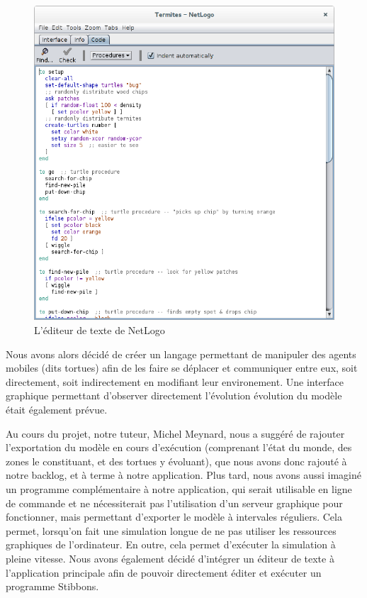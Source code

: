 \begin{figure}[h]
\centering
\includegraphics[scale=0.3]{doc/gestionProjet/netlogo-code.png}
\caption{\label{netlogo-code} L'éditeur de texte de NetLogo}
\end{figure}


Nous avons alors décidé de créer un langage permettant de manipuler des agents mobiles (dits tortues) afin de les faire se déplacer et communiquer entre eux, soit directement, soit indirectement en modifiant leur environement. Une interface graphique permettant d'observer directement l'évolution évolution du modèle était également prévue.

Au cours du projet, notre tuteur, Michel Meynard, nous a suggéré de rajouter l'exportation du modèle en cours d'exécution (comprenant l'état du monde, des zones le constituant, et des tortues y évoluant), que nous avons donc rajouté à notre backlog, et à terme à notre application.
Plus tard, nous avons aussi imaginé un programme complémentaire à notre application, qui serait utilisable en ligne de commande et ne nécessiterait pas l'utilisation d'un serveur graphique pour fonctionner, mais permettant d'exporter le modèle à intervales réguliers.
Cela permet, lorsqu'on fait une simulation longue de ne pas utiliser les ressources graphiques de l'ordinateur. En outre, cela permet d'exécuter la simulation à pleine vitesse.
Nous avons également décidé d'intégrer un éditeur de texte à l'application principale afin de pouvoir directement éditer et exécuter un programme Stibbons.
